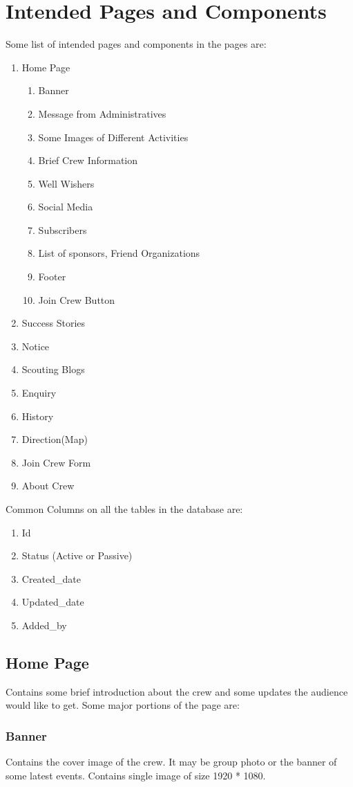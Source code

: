 	\section{Intended Pages and Components}
		Some list of intended pages and components in the pages are:
		\begin{enumerate}
			\item Home Page
			\begin{enumerate}
				\item Banner
				\item Message from Administratives
				\item Some Images of Different Activities
				\item Brief Crew Information
				\item Well Wishers
				\item Social Media
				\item Subscribers
				\item List of sponsors, Friend Organizations
				\item Footer
				\item Join Crew Button
			\end{enumerate}
			\item Success Stories
			\item Notice
			\item Scouting Blogs
			\item Enquiry
			\item History
			\item Direction(Map)
			\item Join Crew Form
			\item About Crew
		\end{enumerate}
		Common Columns on all the tables in the database are:
		\begin{enumerate}
			\item Id
			\item Status (Active or Passive)
			\item Created\_date 
			\item Updated\_date 
			\item Added\_by
		\end{enumerate}
		\subsection{Home Page}
		Contains some brief introduction about the crew and some updates the audience would like to get. Some major portions of the page are:
			\subsubsection{Banner}
				Contains the cover image of the crew. It may be group photo or the banner of some latest events. Contains single image of size 1920 * 1080.
